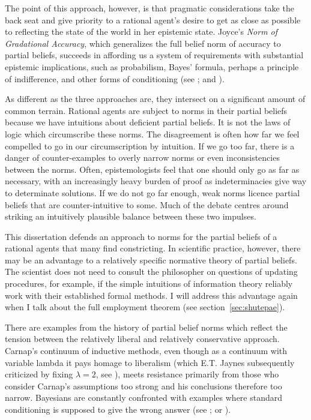 \documentclass[phd,12pt,oneside]{ubcthesis}
\begin{document}
The point of this approach, however, is that pragmatic considerations
take the back seat and give priority to a rational agent's desire to
get as close as possible to reflecting the state of the world in her
epistemic state. Joyce's \emph{Norm of Gradational Accuracy}, which
generalizes the full belief norm of accuracy to partial beliefs,
succeeds in affording us a system of requirements with substantial
epistemic implications, such as probabilism, Bayes' formula, perhaps a
principle of indifference, and other forms of conditioning (see
; and ).

As different as the three approaches are, they intersect on a
significant amount of common terrain. Rational agents are subject to
norms in their partial beliefs because we have intuitions about
deficient partial beliefs. It is not the laws of logic which
circumscribe these norms. The disagreement is often how far we feel
compelled to go in our circumscription by intuition. If we go too far,
there is a danger of counter-examples to overly narrow norms or even
inconsistencies between the norms. Often, epistemologists feel that
one should only go as far as necessary, with an increasingly heavy
burden of proof as indeterminacies give way to determinate solutions.
If we do not go far enough, weak norms licence partial beliefs that
are counter-intuitive to some. Much of the debate centres around
striking an intuitively plausible balance between these two impulses.

This dissertation defends an approach to norms for the partial beliefs
of a rational agents that many find constricting. In scientific
practice, however, there may be an advantage to a relatively specific
normative theory of partial beliefs. The scientist does not need to
consult the philosopher on questions of updating procedures, for
example, if the simple intuitions of information theory reliably work
with their established formal methods. I will address this advantage
again when I talk about the full employment theorem (see
section~\ref{sec:shutepae}).

There are examples from the history of partial belief norms which
reflect the tension between the relatively liberal and relatively
conservative approach. Carnap's continuum of inductive methods, even
though as a continuum with variable lambda it pays homage to
liberalism (which E.T. Jaynes subsequently criticized by fixing
$\lambda=2$, see ), meets resistance
primarily from those who consider Carnap's assumptions too strong and
his conclusions therefore too narrow. Bayesians are constantly
confronted with examples where standard conditioning is supposed to
give the wrong answer (see ; or
).
\end{document}
